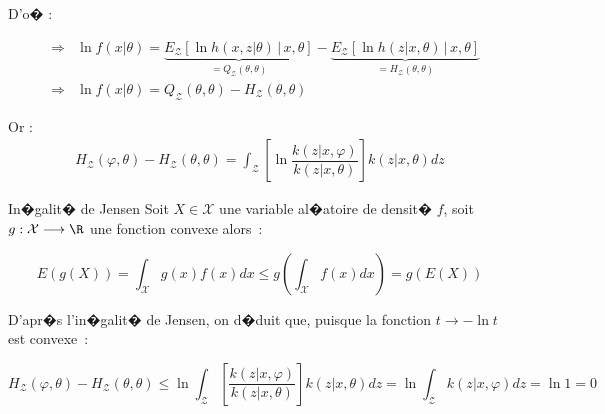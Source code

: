 D'o� :%

        \begin{eqnarray*}
        &  \Longrightarrow & \ln f\left(  x\left|  \theta\right.  \right)  =
                \underset {=Q_{\mathcal{Z}}\left(  \theta,\theta\right)
            }{\underbrace{E_{\mathcal{Z} }\left[  \ln h\left(  x,z\left|  \theta\right.  \right)  \,\left|
                 \,x,\theta\right.  \right]
            }}-\underset{=H_{\mathcal{Z}}\left(  \theta ,\theta\right)  }{\underbrace{E_{\mathcal{Z}}
                    \left[  \ln h\left(  z\left|
            x,\theta\right.  \right)  \,\left|  \,x,\theta\right.  \right]  }}\\
        &  \Longrightarrow & \ln f\left(  x\left|  \theta\right.  \right) =Q_{\mathcal{Z}}\left(  
                \theta,\theta\right) -H_{\mathcal{Z}}\left(
            \theta,\theta\right)
        \end{eqnarray*}

Or :
        \begin{eqnarray*}
        H_{\mathcal{Z}}\left(  \varphi,\theta\right)  -H_{\mathcal{Z}}\left( \theta,\theta\right)
              =\int_{\mathcal{Z}}\left[  \ln\dfrac{k\left(
        z\left|  x,\varphi\right.  \right)  }{k\left(  z\left|  x,\theta\right. \right)  }\right]
              k\left(  z\left|  x,\theta\right.  \right)  dz
        \end{eqnarray*}




            \begin{xtheorem}{In�galit� de Jensen}
            \label{theoreme_inegalite_jensen_1}%
            Soit $X\in\mathcal{X}$ une variable al�atoire de densit� $f$, soit $g:\mathcal{X}\longrightarrow\R$ 
            une fonction convexe alors~:
            
                    $$
                    E\left(  g\left(  X\right)  \right)  =\int _{\mathcal{X}}g\left(  x\right)  
                                f\left(  x\right)  dx\leqslant g\left(
                    \int_{\mathcal{X}}f\left(  x\right)  dx\right)  =g\left(  E\left( X\right)  \right)
                    $$
                    
            \end{xtheorem}

D'apr�s l'in�galit� de Jensen, on d�duit que, puisque la fonction $t\rightarrow-\ln t$ est convexe~:

        $$
        H_{\mathcal{Z}}\left(  \varphi,\theta\right)  -H_{\mathcal{Z}}
                    \left( \theta,\theta\right)  \leqslant\ln\int_{\mathcal{Z}}\left[
        \dfrac{k\left(  z\left|  x,\varphi\right.  \right)  }{k\left(  z\left| x,\theta\right.  \right)  }\right] 
         k\left(  z\left|  x,\theta\right.
        \right)  dz=\ln\int_{\mathcal{Z}}k\left(  z\left|  x,\varphi\right. \right)  dz=\ln1=0
        $$

